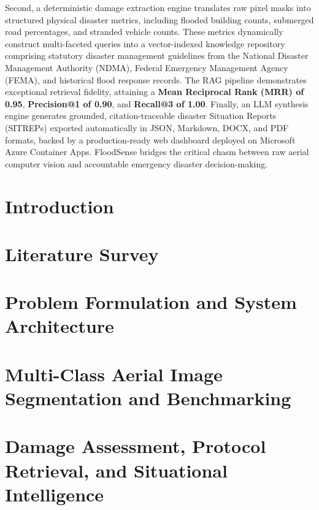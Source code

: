 \documentclass[a4paper, 12pt]{report}
\theoremstyle{definition}
\begin{document}
	Second, a deterministic damage extraction engine translates raw pixel masks into structured physical disaster metrics, including flooded building counts, submerged road percentages, and stranded vehicle counts. These metrics dynamically construct multi-faceted queries into a vector-indexed knowledge repository comprising statutory disaster management guidelines from the National Disaster Management Authority (NDMA), Federal Emergency Management Agency (FEMA), and historical flood response records. The RAG pipeline demonstrates exceptional retrieval fidelity, attaining a \textbf{Mean Reciprocal Rank (MRR) of 0.95}, \textbf{Precision@1 of 0.90}, and \textbf{Recall@3 of 1.00}. Finally, an LLM synthesis engine generates grounded, citation-traceable disaster Situation Reports (SITREPs) exported automatically in JSON, Markdown, DOCX, and PDF formats, backed by a production-ready web dashboard deployed on Microsoft Azure Container Apps. FloodSense bridges the critical chasm between raw aerial computer vision and accountable emergency disaster decision-making.

	\clearpage
	\setcounter{page}{1}

	\chapter{Introduction}
	

	\chapter{Literature Survey}
	

	\chapter{Problem Formulation and System Architecture}
	

	\chapter{Multi-Class Aerial Image Segmentation and Benchmarking}
	 

	\chapter{Damage Assessment, Protocol Retrieval, and Situational Intelligence}
	
\end{document}
